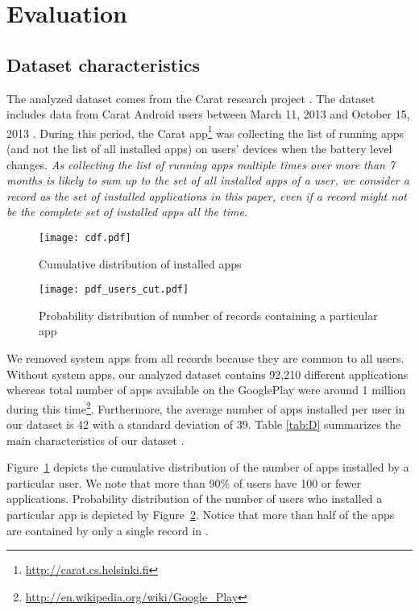 \documentclass{acm_proc_article-sp}
\theoremstyle{plain}
\theoremstyle{plain}
\theoremstyle{plain}
\theoremstyle{plain}
\theoremstyle{plain}
\theoremstyle{plain}
\begin{document}
\section{Evaluation}

\subsection{Dataset characteristics}
\label{sec:dataset}
The analyzed dataset comes from the Carat research project \cite{Oliner:2013}.
The dataset includes data from  Carat Android users between March 11, 2013 and October 15, 2013  \cite{Truong:2014}.
During this period, the Carat app\footnote{\url{http://carat.cs.helsinki.fi}} was collecting the list of running apps (and not the list of all installed apps) on users' devices when the battery level changes.
\emph{As collecting the list of running apps multiple times over more than 7 months is likely to sum up to the set of all installed apps of a user, we consider a record as the set of installed applications in this paper, even if a record might not be the complete set of installed apps all the time.}








\begin{figure}[h]
	\centering
	\texttt{[image: cdf.pdf]}
	\caption{Cumulative distribution of installed apps}
	\label{fig:cdf}
\end{figure}


\begin{figure}[h]
	\centering
	\texttt{[image: pdf\_users\_cut.pdf]}
	\caption{Probability distribution of number of records containing a particular app}
	\label{fig:pdf_users_cut}
\end{figure}

We removed system apps from all records because they are common to all users.
Without system apps, our analyzed dataset contains 92,210 different applications whereas total number of apps available on the GooglePlay were around 1 million during this time\footnote{\url{http://en.wikipedia.org/wiki/Google_Play}}.
Furthermore, the average number of apps installed per user in our dataset is 42 with a standard deviation of 39.
Table \ref{tab:D} summarizes the main characteristics of our dataset .

Figure~\ref{fig:cdf} depicts the cumulative distribution of the number of apps installed by a particular user.
We note that more than 90\% of users have 100 or fewer applications. 
Probability distribution of the number of users who installed a particular app is depicted by Figure~\ref{fig:pdf_users_cut}.
Notice that more than half of the apps are contained by only a single record in .
\end{document}
